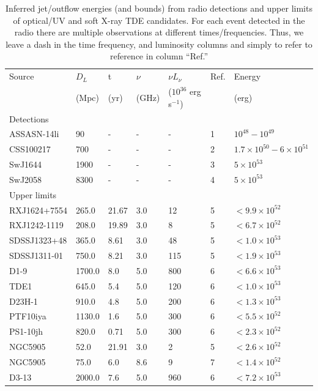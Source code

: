 \documentclass[usenatbib,fleqn]{mnras}
\begin{document}
\begin{table}
\begin{threeparttable}
  \caption{\label{tab:enConstr} Inferred jet/outflow energies (and
    bounds) from radio detections and upper limits of optical/UV and
    soft X-ray TDE candidates. For each event detected in the radio
    there are multiple observations at different
    times/frequencies. Thus, we leave a dash in the time frequency,
    and luminosity columns and simply to refer to reference in column ``Ref.''}
\begin{tabular*}{1.5\columnwidth}{lllllll}
\hline
Source & $D_L$ & t & $\nu$ & $\nu L_{\nu}$ & Ref. & Energy\\
& (Mpc) & (yr) & (GHz) & ($10^{36}$ erg s$^{-1}$) & & (erg) \\
\hline
Detections \\
\hline
ASSASN-14li & 90 & - & - & - & 1 &  $10^{48}-10^{49}$\\
CSS100217 & 700 & - & - & - & 2 & $1.7\times 10^{50}-6\times 10^{51}$\\
SwJ1644 & 1900 & - & - & - &  3  & $5\times 10^{53}$\\
SwJ2058 & 8300  & - & - & - & 4 & $5\times 10^{53}$\\ 
\hline 
Upper limits & \\
\hline
RXJ1624+7554 & 265.0 & 21.67 & 3.0 & 12 & 5 & $< 9.9 \times 10^{ 52 }$ \\
RXJ1242-1119 & 208.0 & 19.89 & 3.0 & 8 & 5 & $< 6.7 \times 10^{ 52 }$ \\
SDSSJ1323+48 & 365.0 & 8.61 & 3.0 & 48 & 5 & $< 1.0 \times 10^{ 53 }$ \\
SDSSJ1311-01 & 750.0 & 8.21 & 3.0 & 115 & 5 & $< 1.9 \times 10^{ 53 }$ \\
D1-9 & 1700.0 & 8.0 & 5.0 & 800 & 6 & $< 6.6 \times 10^{ 53 }$ \\
TDE1 & 645.0 & 5.4 & 5.0 & 120 & 6 & $< 1.0 \times 10^{ 53 }$ \\
D23H-1 & 910.0 & 4.8 & 5.0 & 200 & 6 & $< 1.3 \times 10^{ 53 }$ \\
PTF10iya & 1130.0 & 1.6 & 5.0 & 300 & 6 & $< 5.5 \times 10^{ 52 }$ \\
PS1-10jh & 820.0 & 0.71 & 5.0 & 300 & 6 & $< 2.3 \times 10^{ 52 }$ \\
NGC5905 & 52.0 & 21.91 & 3.0 & 2 & 5 & $< 2.6 \times 10^{ 52 }$ \\
NGC5905 & 75.0 & 6.0 & 8.6 & 9 & 7 & $< 1.4 \times 10^{ 52 }$ \\
D3-13 & 2000.0 & 7.6 & 5.0 & 960 & 6 & $< 7.2 \times 10^{ 53 }$ \\

\end{tabular*}
\end{threeparttable}
\end{table}
\end{document}
